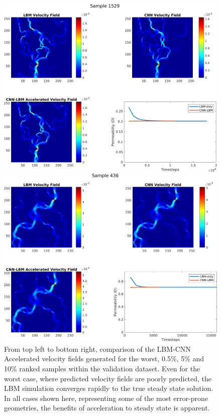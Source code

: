 \documentclass{article}
\begin{document}
\begin{figure}[htp!]
\begin{minipage}[b]{0.49\textwidth}
    \includegraphics[width=\textwidth]{figures/velAccCNNs1529-6.png}
  \end{minipage}
  \hfill
  \begin{minipage}[b]{0.49\textwidth}
    \includegraphics[width=\textwidth]{figures/velAccCNNs436-6.png}
  \end{minipage}
    \caption{From top left to bottom right, comparison of the LBM-CNN Accelerated velocity fields generated for the worst, 0.5\%, 5\% and 10\% ranked samples within the validation dataset. Even for the worst case, where predicted velocity fields are poorly predicted, the LBM simulation converges rapidly to the true steady state solution. In all cases shown here, representing some of the most error-prone geometries, the benefits of acceleration to steady state is apparent.}
    \label{fig:velAccelerate}
\end{figure}
\end{document}
